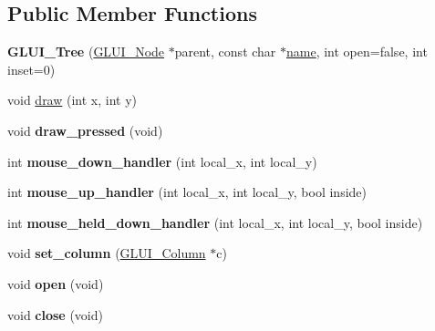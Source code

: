 \subsection*{Public Member Functions}
\begin{DoxyCompactItemize}
\item 
\hypertarget{classGLUI__Tree_a2c31d1ac60654e1ee8b818c80bbb965a}{{\bfseries G\-L\-U\-I\-\_\-\-Tree} (\hyperlink{classGLUI__Node}{G\-L\-U\-I\-\_\-\-Node} $\ast$parent, const char $\ast$\hyperlink{classGLUI__Control_aa95b97d50df45335fc33f0af03958eb3}{name}, int open=false, int inset=0)}\label{classGLUI__Tree_a2c31d1ac60654e1ee8b818c80bbb965a}

\item 
void \hyperlink{classGLUI__Tree_a95b179b8d413fc280ef58cb62f9defb2}{draw} (int x, int y)
\item 
\hypertarget{classGLUI__Tree_a1360117342c313ed0c1cdd879f4550f5}{void {\bfseries draw\-\_\-pressed} (void)}\label{classGLUI__Tree_a1360117342c313ed0c1cdd879f4550f5}

\item 
\hypertarget{classGLUI__Tree_a0b127300ac1c19eb94122c4255ab2834}{int {\bfseries mouse\-\_\-down\-\_\-handler} (int local\-\_\-x, int local\-\_\-y)}\label{classGLUI__Tree_a0b127300ac1c19eb94122c4255ab2834}

\item 
\hypertarget{classGLUI__Tree_afadc8d29f7aaf67b907009e80f7b861e}{int {\bfseries mouse\-\_\-up\-\_\-handler} (int local\-\_\-x, int local\-\_\-y, bool inside)}\label{classGLUI__Tree_afadc8d29f7aaf67b907009e80f7b861e}

\item 
\hypertarget{classGLUI__Tree_aef3c1c1a7854845d9cdd338907e46485}{int {\bfseries mouse\-\_\-held\-\_\-down\-\_\-handler} (int local\-\_\-x, int local\-\_\-y, bool inside)}\label{classGLUI__Tree_aef3c1c1a7854845d9cdd338907e46485}

\item 
\hypertarget{classGLUI__Tree_a29c44f7e03795432a29107cfb0caf3ab}{void {\bfseries set\-\_\-column} (\hyperlink{classGLUI__Column}{G\-L\-U\-I\-\_\-\-Column} $\ast$c)}\label{classGLUI__Tree_a29c44f7e03795432a29107cfb0caf3ab}

\item 
\hypertarget{classGLUI__Tree_a9dcfded5ecce182b218e12e207d0a0c4}{void {\bfseries open} (void)}\label{classGLUI__Tree_a9dcfded5ecce182b218e12e207d0a0c4}

\item 
\hypertarget{classGLUI__Tree_a301fe11a1a7bcb344e6fd5eca5915bce}{void {\bfseries close} (void)}\label{classGLUI__Tree_a301fe11a1a7bcb344e6fd5eca5915bce}


\end{DoxyCompactItemize}
